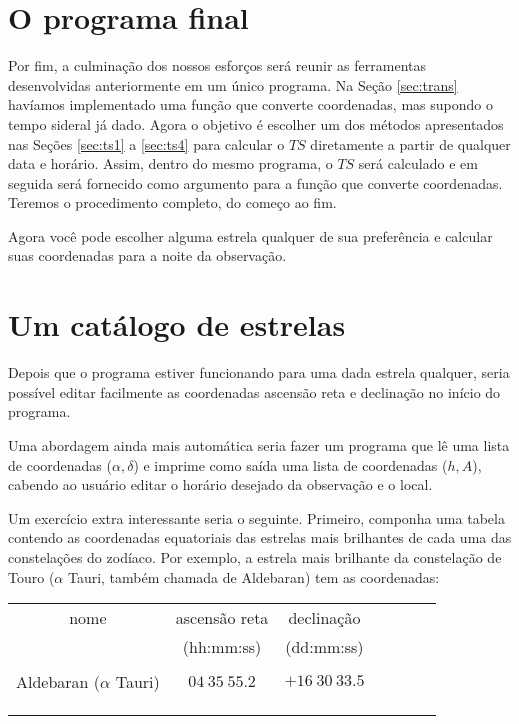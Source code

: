 \section{O programa final}

Por fim, a culminação dos nossos esforços será reunir as ferramentas desenvolvidas anteriormente em um único programa. Na Seção \ref{sec:trans} havíamos implementado uma função que converte coordenadas, mas supondo o tempo sideral já dado. Agora o objetivo é escolher um dos métodos apresentados nas Seções \ref{sec:ts1} a \ref{sec:ts4} para calcular o $TS$ diretamente a partir de qualquer data e horário. Assim, dentro do mesmo programa, o $TS$ será calculado e em seguida será fornecido como argumento para a função que converte coordenadas. Teremos o procedimento completo, do começo ao fim.

Agora você pode escolher alguma estrela qualquer de sua preferência e calcular suas coordenadas para a noite da observação.

\section{Um catálogo de estrelas}

Depois que o programa estiver funcionando para uma dada estrela qualquer, seria possível editar facilmente as coordenadas ascensão reta e declinação no início do programa.

Uma abordagem ainda mais automática seria fazer um programa que lê uma lista de coordenadas ($\alpha, \delta$) e imprime como saída uma lista de coordenadas ($h, A$), cabendo ao usuário editar o horário desejado da observação e o local.

Um exercício extra interessante seria o seguinte. Primeiro, componha uma tabela contendo as coordenadas equatoriais das estrelas mais brilhantes de cada uma das constelações do zodíaco. Por exemplo, a estrela mais brilhante da constelação de Touro ($\alpha$ Tauri, também chamada de Aldebaran) tem as coordenadas:

\begin{center}
\begin{tabular}{ccccccc}
\hline
nome & ascensão reta & declinação  \\
& (hh:mm:ss) & (dd:mm:ss) \\

\hline
&&\\
Aldebaran ($\alpha$ Tauri) & $04~35~55.2$ & $+16~30~33.5$ \\
&&\\
&&\\
&&\\
\hline
\end{tabular}
\end{center}

